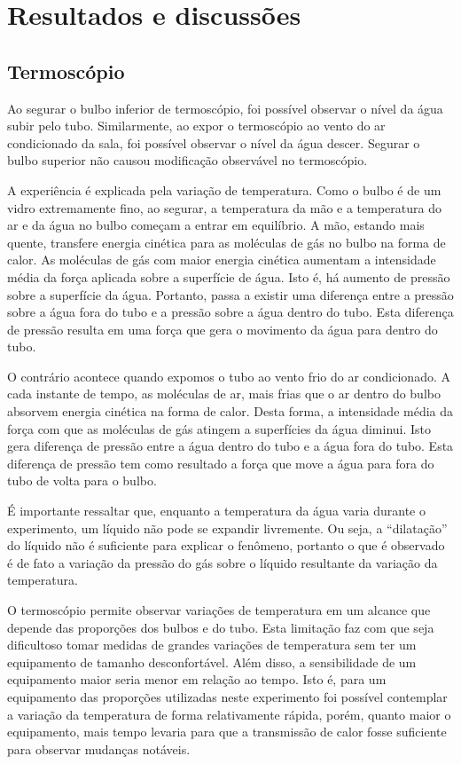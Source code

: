 \section{Resultados e discussões}
\subsection{Termoscópio}

Ao segurar o bulbo inferior de termoscópio, foi possível observar o nível da água subir pelo tubo. Similarmente, ao expor o termoscópio ao vento do ar condicionado da sala, foi possível observar o nível da água descer. Segurar o bulbo superior não causou modificação observável no termoscópio. 

A experiência é explicada pela variação de temperatura. Como o bulbo é de um vidro extremamente fino, ao segurar, a temperatura da mão e a temperatura do ar e da água no bulbo começam a entrar em equilíbrio. A mão, estando mais quente, transfere energia cinética para as moléculas de gás no bulbo na forma de calor. As moléculas de gás com maior energia cinética aumentam a intensidade média da força aplicada sobre a superfície de água. Isto é, há aumento de pressão sobre a superfície da água. Portanto, passa a existir uma diferença entre a pressão sobre a água fora do tubo e a pressão sobre a água dentro do tubo. Esta diferença de pressão resulta em uma força que gera o movimento da água para dentro do tubo. 

O contrário acontece quando expomos o tubo ao vento frio do ar condicionado. A cada instante de tempo, as moléculas de ar, mais frias que o ar dentro do bulbo absorvem energia cinética na forma de calor. Desta forma, a intensidade média da força com que as moléculas de gás atingem a superfícies da água diminui. Isto gera diferença de pressão entre a água dentro do tubo e a água fora do tubo. Esta diferença de pressão  tem como resultado a força que move a água para fora do tubo de volta para o bulbo.

É importante ressaltar que, enquanto a temperatura da água varia durante o experimento, um líquido não pode se expandir livremente. Ou seja, a ``dilatação'' do líquido não é suficiente para explicar o fenômeno, portanto o que é observado é de fato a variação da pressão do gás sobre o líquido resultante da variação da temperatura. 

O termoscópio permite observar variações de temperatura em um alcance que depende das proporções dos bulbos e do tubo. Esta limitação faz com que seja dificultoso tomar medidas de grandes variações de temperatura sem ter um equipamento de tamanho desconfortável. Além disso, a sensibilidade de um equipamento maior seria menor em relação ao tempo. Isto é, para um equipamento das proporções utilizadas neste experimento foi possível contemplar a variação da temperatura de forma relativamente rápida, porém, quanto maior o equipamento, mais tempo levaria para que a transmissão de calor fosse suficiente para observar mudanças notáveis. 

